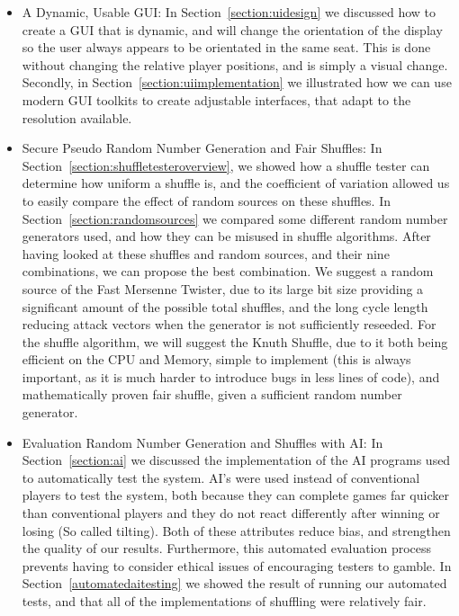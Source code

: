 \begin{itemize}
\item A Dynamic, Usable GUI\@:
In Section~\ref{section:uidesign} we discussed how to create a GUI that is dynamic,
and will change the orientation of the display so the user always appears to
be orientated in the same seat. This is done without changing the relative
player positions, and is simply a visual change.
Secondly, in Section~\ref{section:uiimplementation} we illustrated how we
can use modern GUI toolkits to create adjustable interfaces, that adapt to
the resolution available.

\item Secure Pseudo Random Number Generation and Fair Shuffles:
In Section~\ref{section:shuffletesteroverview}, we showed how a shuffle tester
can determine how uniform a shuffle is, and the coefficient of variation allowed
us to easily compare the effect of random sources on these shuffles.
In Section~\ref{section:randomsources} we compared some different random number
generators used, and how they can be misused in shuffle algorithms. After
having looked at these shuffles and random sources, and their nine combinations,
we can propose the best combination. We suggest a random source of the Fast Mersenne Twister,
due to its large bit size providing a significant amount of the possible
total shuffles, and the long cycle length reducing attack vectors when the
generator is not sufficiently reseeded. For the shuffle algorithm, we will
suggest the Knuth Shuffle, due to it both being efficient on the CPU and Memory,
simple to implement (this is always important, as it is much harder to introduce
bugs in less lines of code), and mathematically proven fair shuffle,
given a sufficient random number generator.

\item Evaluation Random Number Generation and Shuffles with AI\@:
In Section~\ref{section:ai} we discussed the implementation of the AI programs
used to automatically test the system. AI's were used instead of conventional
players to test the system, both because they can complete games far quicker
than conventional players and they do not react differently after winning or
losing (So called tilting). Both of these attributes reduce bias, and strengthen
the quality of our results. Furthermore, this automated evaluation process
prevents having to consider ethical issues of encouraging testers to gamble.
In Section~\ref{automatedaitesting} we showed the result of running our
automated tests, and that all of the implementations of shuffling were relatively
fair.
\end{itemize}

